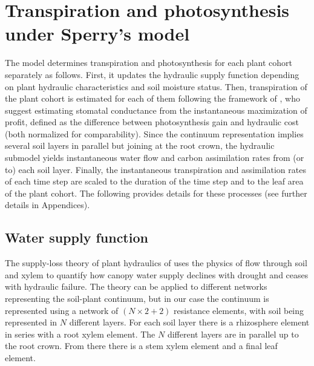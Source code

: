 \documentclass[]{book}
\begin{document}
\hypertarget{transpirationsperry}{%
\chapter{Transpiration and photosynthesis under Sperry's model}\label{transpirationsperry}}

The model determines transpiration and photosynthesis for each plant cohort separately as follows. First, it updates the hydraulic supply function depending on plant hydraulic characteristics and soil moisture status. Then, transpiration of the plant cohort is estimated for each of them following the framework of \citet{Sperry2016}, who suggest estimating stomatal conductance from the instantaneous maximization of profit, defined as the difference between photosynthesis gain and hydraulic cost (both normalized for comparability). Since the continuum representation implies several soil layers in parallel but joining at the root crown, the hydraulic submodel yields instantaneous water flow and carbon assimilation rates from (or to) each soil layer. Finally, the instantaneous transpiration and assimilation rates of each time step are scaled to the duration of the time step and to the leaf area of the plant cohort. The following provides details for these processes (see further details in Appendices).

\hypertarget{water-supply-function}{%
\section{Water supply function}\label{water-supply-function}}

The supply-loss theory of plant hydraulics of \citet{Sperry2015} uses the physics of flow through soil and xylem to quantify how canopy water supply declines with drought and ceases with hydraulic failure. The theory can be applied to different networks representing the soil-plant continuum, but in our case the continuum is represented using a network of \((N \times 2 + 2)\) resistance elements, with soil being represented in \(N\) different layers. For each soil layer there is a rhizosphere element in series with a root xylem element. The \(N\) different layers are in parallel up to the root crown. From there there is a stem xylem element and a final leaf element.
\end{document}
